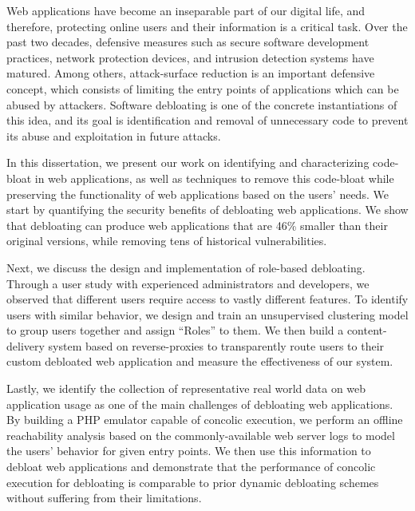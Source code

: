 Web applications have become an inseparable part of our digital life, and therefore, protecting online users and their information is a critical task. 
Over the past two decades, defensive measures such as secure software development practices, network protection devices, and intrusion detection systems have matured. 
Among others, attack-surface reduction is an important defensive concept, which consists of limiting the entry points of applications which can be abused by attackers. 
Software debloating is one of the concrete instantiations of this idea, and its goal is identification and removal of unnecessary code to prevent its abuse and exploitation in future attacks. 

In this dissertation, we present our work on identifying and characterizing code-bloat in web applications, as well as techniques to remove this code-bloat while preserving the functionality of web applications based on the users' needs.
We start by quantifying the security benefits of debloating web applications. We show that debloating can produce web applications that are 46\% smaller than their original versions, while removing tens of historical vulnerabilities. 

Next, we discuss the design and implementation of role-based debloating.
Through a user study with experienced administrators and developers, we observed that different users require access to vastly different features.
To identify users with similar behavior, we design and train an unsupervised clustering model to group users together and assign ``Roles'' to them. 
We then build a content-delivery system based on reverse-proxies to transparently route users to their custom debloated web application and measure the effectiveness of our system. 

Lastly, we identify the collection of representative real world data on web application usage as one of the main challenges of debloating web applications. 
By building a PHP emulator capable of concolic execution, we perform an offline reachability analysis based on the commonly-available web server logs to model the users' behavior for given entry points. 
We then use this information to debloat web applications and demonstrate that the performance of concolic execution for debloating is comparable to prior dynamic debloating schemes without suffering from their limitations.